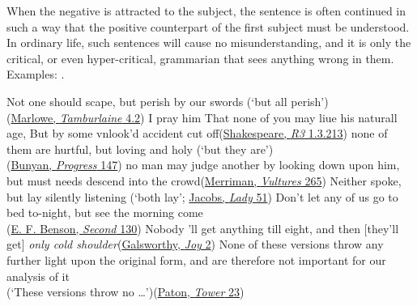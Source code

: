 When the negative is attracted to the subject, the sentence is often continued in such a way that the positive counterpart of the first subject must be understood. In ordinary life, such sentences will cause no misunderstanding, and it is only the critical, or even hyper-critical, grammarian that sees anything wrong in them. Examples: .

\ea \label{ex:06-35}
\ea Not one should scape, but perish by our swords \phantom{x} (`but all perish')\\\hfill(\href{https://quod.lib.umich.edu/e/eebo/A07004.0001.001/1:3.5.2?rgn=div3;view=fulltext}{Marlowe, \textit{Tamburlaine} 4.2})
\ex I pray him That none of you may liue his naturall age, But by some vnlook'd accident cut off\hfill(\href{https://internetshakespeare.uvic.ca/doc/R3_F1/scene/1.3/index.html#tln-680}{Shakespeare, \textit{R3} 1.3.213})
\ex none of them are hurtful, but loving and holy \phantom{x} (`but they are')\\\hfill(\href{https://archive.org/details/bunyanspilgrims00moffgoog/page/18/mode/2up?q=%22are+hurtful%22&view=theater}{Bunyan, \textit{Progress} 147}) %
\ex no man may judge another by looking down upon him, but must needs descend into the crowd\hfill(\href{https://archive.org/details/vulturesnovel00merr/page/266/mode/2up?ref=ol&view=theater&q=%22judge+another+by+looking%22}{Merriman, \textit{Vultures} 265})
\ex Neither spoke, but lay silently listening \hfill(`both lay'; \href{https://archive.org/details/ladyofbarge00jaco/page/50/mode/2up?q=%22neither+spoke%22&view=theater}{Jacobs, \textit{Lady} 51})
\ex Don't let any of us go to bed to-night, but see the morning come\\\hfill(\href{https://archive.org/details/dodosecond00bensiala/page/120/mode/2up?view=theater&q=%22don%27t+let+any+of+us%22}{E. F. Benson, \textit{Second} 130})
\ex Nobody 'll get anything till eight, and then [they'll get]\textit{ only cold shoulder}\hfill(\href{https://archive.org/details/joyplayonletteri00gals/page/124/mode/2up?q=%22cold+shoulder%22&view=theater}{Galsworthy, \textit{Joy} 2}) %
\ex None of these versions throw any further light upon the original form, and are therefore not important for our analysis of it\\
(`These versions throw no {\dots}')\hfill(\href{https://babel.hathitrust.org/cgi/pt?id=hvd.hn8nyu&seq=39}{Paton, \textit{Tower} 23}) %
\z
\z

